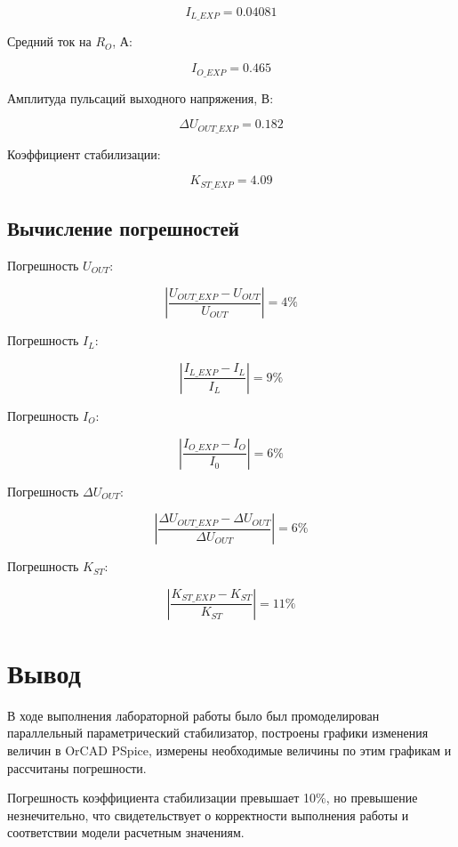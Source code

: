 \[
I_{L\_EXP}=0.04081
\]

Средний ток на $R_O$, А:	         					

\[
I_{O\_EXP}=0.465
\]

Амплитуда пульсаций выходного напряжения, В:	

\[
\Delta U_{OUT\_EXP}=0.182
\]

Коэффициент стабилизации:				

\[
K_{ST\_EXP}=4.09
\]


\section{Вычисление погрешностей}

Погрешность $U_{OUT}$:

\[
\left|\frac{U_{OUT\_EXP}-U_{OUT}}{U_{OUT}} \right| = 4 \%
\]

Погрешность $I_L$:

\[
\left| \frac{I_{L\_EXP}-I_L}{I_L} \right|=9 \%
\]

Погрешность $I_O$: 

\[
\left| \frac{I_{O\_EXP}-I_O}{I_0} \right|= 6 \%
\]

Погрешность $\Delta U_{OUT}$:

\[
\left|  \frac{\Delta U_{OUT\_EXP}-\Delta U_{OUT}}{\Delta U_{OUT}} \right| =6 \%
\]

Погрешность $K_{ST}$:

\[
\left| \frac{K_{ST\_EXP}-K_{ST}}{K_{ST}} \right|=11\%
\]

\chapter{Вывод}

В ходе выполнения лабораторной работы было был промоделирован параллельный параметрический стабилизатор, построены графики изменения величин в OrCAD PSpice, измерены необходимые величины по этим графикам и рассчитаны погрешности.

Погрешность коэффициента стабилизации превышает 10\%, но
 превышение незнечительно, что свидетельствует о корректности выполнения работы и соответствии модели расчетным значениям.

